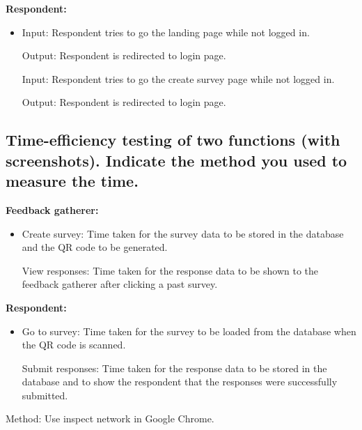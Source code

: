 \documentclass[letterpaper, 12 pt, conference]{ieeeconf}
\begin{document}
\textbf{Respondent:}
\begin{itemize}
    \item[] Input: Respondent tries to go the landing page while not logged in.

Output: Respondent is redirected to login page.

Input: Respondent tries to go the create survey page while not logged in.

Output: Respondent is redirected to login page.

\end{itemize}
\newpage 

\subsection{Time-eﬀiciency testing of two functions (with screenshots). Indicate the method you used to measure the time.}
\newline

\textbf{Feedback gatherer:}
\begin{itemize}
    \item[] Create survey: Time taken for the survey data to be stored in the database and the QR code to be generated.

View responses: Time taken for the response data to be shown to the feedback gatherer after clicking a past survey.
\end{itemize}
\newline
\hfill \break


\textbf{Respondent:}
\begin{itemize}
    \item[] Go to survey: Time taken for the survey to be loaded from the database when the QR code is scanned.

Submit responses: Time taken for the response data to be stored in the database and to show the respondent that the responses were successfully submitted.

\end{itemize}
\newline
\hfill \break
Method: Use inspect network in Google Chrome.


\addtolength{\textheight}{-12cm}





\end{document}
